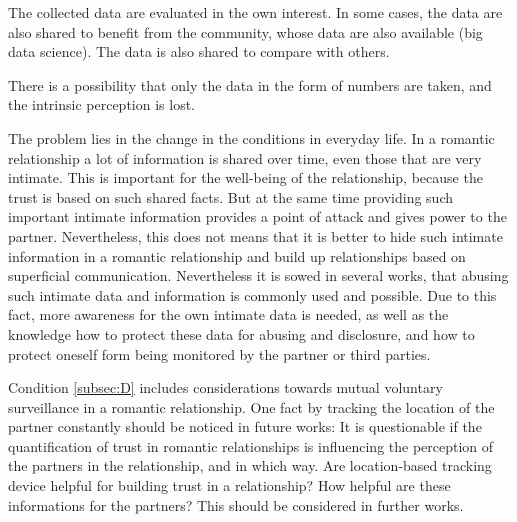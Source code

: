 \documentclass[journal]{vgtc}                %
\begin{document}
The collected data are evaluated in the own interest. In some cases, the data are also shared to benefit from the community, whose data are also available (big data science). The data is also shared to compare with others.

There is a possibility that only the data in the form of numbers are taken, and the intrinsic perception is lost.

The problem lies in the change in the conditions in everyday life.
In a romantic relationship a lot of information is shared over time, even those that are very intimate. This is important for the well-being of the relationship, because the trust is based on such shared facts. But at the same time providing such important intimate information provides a point of attack and gives power to the partner. Nevertheless, this does not means that it is better to hide such intimate information in a romantic relationship and build up relationships based on superficial communication.
Nevertheless it is sowed in several works, that abusing such intimate data and information is commonly used and possible. Due to this fact, more awareness for the own intimate data is needed, as well as the knowledge how to protect these data for abusing and disclosure, and how to protect oneself form being monitored by the partner or third parties.

Condition \ref{subsec:D} includes considerations towards mutual voluntary surveillance in a romantic relationship. One fact by tracking the location of the partner constantly should be noticed in future works: It is questionable if the quantification of trust in romantic relationships is influencing the perception of the partners in the relationship, and in which way. Are location-based tracking device helpful for building trust in a relationship? How helpful are these informations for the partners? This should be considered in further works.

\printbibliography
\end{document}

